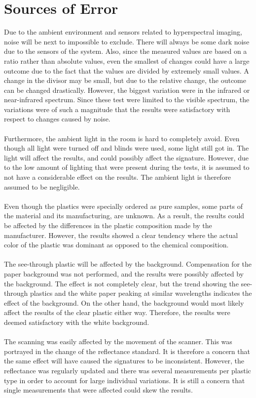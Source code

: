 \section{Sources of Error}
Due to the ambient environment and sensors related to hyperspectral imaging, noise will be next to impossible to exclude. There will always be some dark noise due to the sensors of the system. Also, since the measured values are based on a ratio rather than absolute values, even the smallest of changes could have a large outcome due to the fact that the values are divided by extremely small values. A change in the divisor may be small, but due to the relative change, the outcome can be changed drastically. However, the biggest variation were in the infrared or near-infrared spectrum. Since these test were limited to the visible spectrum, the variations were of such a magnitude that the results were satisfactory with respect to changes caused by noise. 
\\\\
Furthermore, the ambient light in the room is hard to completely avoid. Even though all light were turned off and blinds were used, some light still got in. The light will affect the results, and could possibly affect the signature. However, due to the low amount of lighting that were present during the tests, it is assumed to not have a considerable effect on the results. The ambient light is therefore assumed to be negligible. 
\\\\
Even though the plastics were specially ordered as pure samples, some parts of the material and its manufacturing, are unknown. As a result, the results could be affected by the differences in the plastic composition made by the manufacturer. However, the results showed a clear tendency where the actual color of the plastic was dominant as opposed to the chemical composition.
\\\\
The see-through plastic will be affected by the background. Compensation for the paper background was not performed, and the results were possibly affected by the background. The effect is not completely clear, but the trend showing the see-through plastics and the white paper peaking at similar wavelengths indicates the effect of the background. On the other hand, the background would most likely affect the results of the clear plastic either way. Therefore, the results were deemed satisfactory with the white background.
\\\\
The scanning was easily affected by the movement of the scanner. This was portrayed in the change of the reflectance standard. It is therefore a concern that the same effect will have caused the signatures to be inconsistent. However, the reflectance was regularly updated and there was several measurements per plastic type in order to account for large individual variations. It is still a concern that single measurements that were affected could skew the results.

